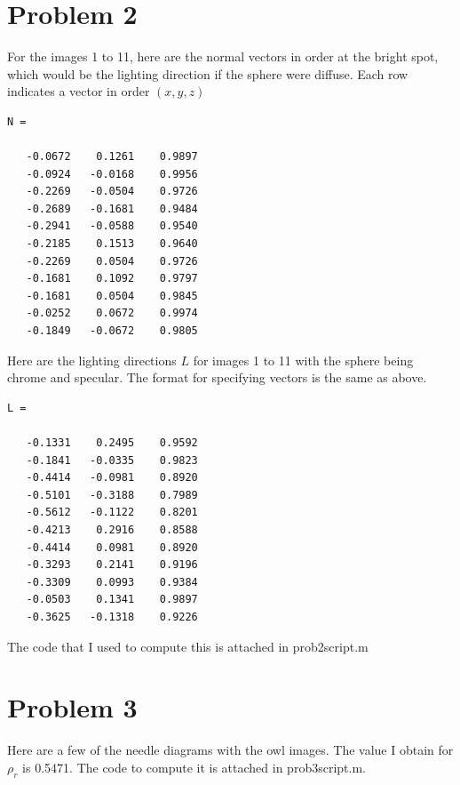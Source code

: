 \documentclass[11pt,psfig]{article}
\begin{document}
\section*{Problem 2}

For the images 1 to 11, here are the normal vectors in order at the bright spot, which would be the lighting direction if the sphere were diffuse. Each row indicates a vector in order $(x,y,z)$ 
\begin{verbatim}
N =

   -0.0672    0.1261    0.9897
   -0.0924   -0.0168    0.9956
   -0.2269   -0.0504    0.9726
   -0.2689   -0.1681    0.9484
   -0.2941   -0.0588    0.9540
   -0.2185    0.1513    0.9640
   -0.2269    0.0504    0.9726
   -0.1681    0.1092    0.9797
   -0.1681    0.0504    0.9845
   -0.0252    0.0672    0.9974
   -0.1849   -0.0672    0.9805
\end{verbatim}

Here are the lighting directions $L$ for images 1 to 11 with the sphere being chrome and specular. The format for specifying vectors is the same as above.

\begin{verbatim}
L =

   -0.1331    0.2495    0.9592
   -0.1841   -0.0335    0.9823
   -0.4414   -0.0981    0.8920
   -0.5101   -0.3188    0.7989
   -0.5612   -0.1122    0.8201
   -0.4213    0.2916    0.8588
   -0.4414    0.0981    0.8920
   -0.3293    0.2141    0.9196
   -0.3309    0.0993    0.9384
   -0.0503    0.1341    0.9897
   -0.3625   -0.1318    0.9226
\end{verbatim}

The code that I used to compute this is attached in prob2script.m

\newpage

\section*{Problem 3}

Here are a few of the needle diagrams with the owl images. The value I obtain for $\rho_r$ is 0.5471. The code to compute it is attached in prob3script.m.
\end{document}
